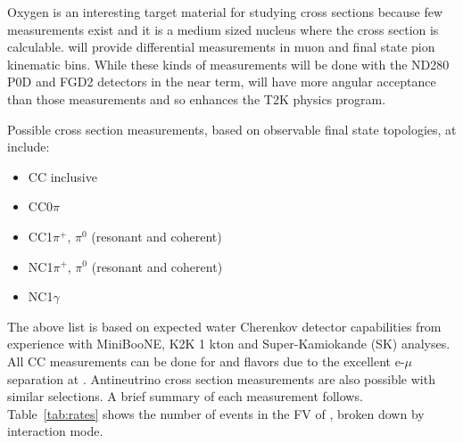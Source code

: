 

Oxygen is an interesting target material for studying cross sections because few measurements exist and it is a medium sized nucleus where the cross section is calculable. \nuprismlite will provide differential measurements in muon and final state pion kinematic bins. While these kinds of measurements will be done with the ND280 P0D and FGD2 detectors in the near term, \nuprismlite will have more angular acceptance than those measurements and so enhances the T2K physics program.

Possible cross section measurements, based on observable final state topologies, at \nuprismlite include:

\begin{itemize}
\item CC inclusive
\item CC0$\pi$ 
\item CC1$\pi^+$, $\pi^0$ (resonant and coherent)
\item NC1$\pi^+$, $\pi^0$ (resonant and coherent) 
\item NC1$\gamma$ 
\end{itemize}

The above list is based on expected water Cherenkov detector capabilities from experience with MiniBooNE, K2K 1 kton and Super-Kamiokande (SK) analyses. All CC measurements can be done for \numu and \nue flavors due to the excellent e-$\mu$ separation at \nuprismlite.  Antineutrino cross section measurements are also possible with similar selections. A brief summary of each measurement follows.
Table~\ref{tab:rates} shows the number of events in the FV of \nuprismlite, broken down by interaction mode.

